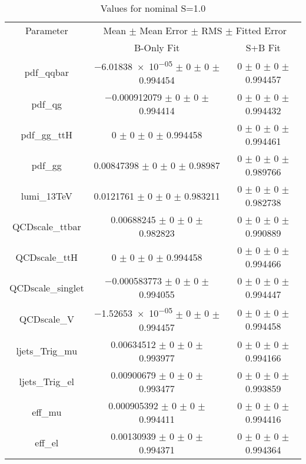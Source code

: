 \begin{table}
\centering
\caption{Values for nominal S=1.0}
\begin{tabular}{ccc}
\toprule
Parameter 	& \multicolumn{2}{c}{Mean $\pm$ Mean Error $\pm$ RMS $\pm$ Fitted Error}\\
 	& B-Only Fit & S+B Fit\\
\midrule
pdf\_qqbar 	& \num{-6.01838e-05} $\pm$ \num{0} $\pm$ \num{0} $\pm$ \num{0.994454} 	& \num{0} $\pm$ \num{0} $\pm$ \num{0} $\pm$ \num{0.994457}\\
pdf\_qg 	& \num{-0.000912079} $\pm$ \num{0} $\pm$ \num{0} $\pm$ \num{0.994414} 	& \num{0} $\pm$ \num{0} $\pm$ \num{0} $\pm$ \num{0.994432}\\
pdf\_gg\_ttH 	& \num{0} $\pm$ \num{0} $\pm$ \num{0} $\pm$ \num{0.994458} 	& \num{0} $\pm$ \num{0} $\pm$ \num{0} $\pm$ \num{0.994461}\\
pdf\_gg 	& \num{0.00847398} $\pm$ \num{0} $\pm$ \num{0} $\pm$ \num{0.98987} 	& \num{0} $\pm$ \num{0} $\pm$ \num{0} $\pm$ \num{0.989766}\\
lumi\_13TeV 	& \num{0.0121761} $\pm$ \num{0} $\pm$ \num{0} $\pm$ \num{0.983211} 	& \num{0} $\pm$ \num{0} $\pm$ \num{0} $\pm$ \num{0.982738}\\
QCDscale\_ttbar 	& \num{0.00688245} $\pm$ \num{0} $\pm$ \num{0} $\pm$ \num{0.982823} 	& \num{0} $\pm$ \num{0} $\pm$ \num{0} $\pm$ \num{0.990889}\\
QCDscale\_ttH 	& \num{0} $\pm$ \num{0} $\pm$ \num{0} $\pm$ \num{0.994458} 	& \num{0} $\pm$ \num{0} $\pm$ \num{0} $\pm$ \num{0.994466}\\
QCDscale\_singlet 	& \num{-0.000583773} $\pm$ \num{0} $\pm$ \num{0} $\pm$ \num{0.994055} 	& \num{0} $\pm$ \num{0} $\pm$ \num{0} $\pm$ \num{0.994447}\\
QCDscale\_V 	& \num{-1.52653e-05} $\pm$ \num{0} $\pm$ \num{0} $\pm$ \num{0.994457} 	& \num{0} $\pm$ \num{0} $\pm$ \num{0} $\pm$ \num{0.994458}\\
ljets\_Trig\_mu 	& \num{0.00634512} $\pm$ \num{0} $\pm$ \num{0} $\pm$ \num{0.993977} 	& \num{0} $\pm$ \num{0} $\pm$ \num{0} $\pm$ \num{0.994166}\\
ljets\_Trig\_el 	& \num{0.00900679} $\pm$ \num{0} $\pm$ \num{0} $\pm$ \num{0.993477} 	& \num{0} $\pm$ \num{0} $\pm$ \num{0} $\pm$ \num{0.993859}\\
eff\_mu 	& \num{0.000905392} $\pm$ \num{0} $\pm$ \num{0} $\pm$ \num{0.994411} 	& \num{0} $\pm$ \num{0} $\pm$ \num{0} $\pm$ \num{0.994416}\\
eff\_el 	& \num{0.00130939} $\pm$ \num{0} $\pm$ \num{0} $\pm$ \num{0.994371} 	& \num{0} $\pm$ \num{0} $\pm$ \num{0} $\pm$ \num{0.994364}\\

\end{tabular}
\end{table}
